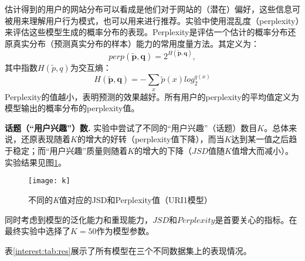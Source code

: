 估计得到的用户的网站分布可以看成是他们对于网站的（潜在）偏好，这些信息可被用来理解用户行为模式，也可以用来进行推荐。实验中使用混乱度（perplexity）来评估这些模型生成的概率分布的表现。Perplexity是评估一个估计的概率分布还原真实分布（预测真实分布的样本）能力的常用度量方法。其定义为：
\[
perp(\mathbf{\widetilde{p}},\mathbf{q}) = 2^{H(\mathbf{\widetilde{p}},\mathbf{q})},
\]
其中指数$H(\widetilde{p},q)$为交互熵：
\[
H(\mathbf{\widetilde{p}},\mathbf{q}) = - \sum_x{\widetilde{p}(x)log_2^{q(x)}}
\]
Perplexity的值越小，表明预测的效果越好。所有用户的perplexity的平均值定义为模型输出的概率分布的perplexity值。


\textbf{话题（``用户兴趣''）数.} 实验中尝试了不同的``用户兴趣''（话题）数目$K$。总体来说，还原表现随着$K$的增大的好转（perplexity值下降），而当$K$达到某一值之后趋于稳定；而``用户兴趣''质量则随着$K$的增大的下降（$JSD$值随$K$值增大而减小）。实验结果见图\ref{interest:fig:k}。

\begin{figure}
\centering
\texttt{[image: k]}
\caption{不同的\textit{K}值对应的JSD和Perplexity值（URI1模型）}
\label{interest:fig:k}
\end{figure}

同时考虑到模型的泛化能力和重现能力，$JSD$和$Perplexity$是首要关心的指标。在最终实验中选择了$K = 50$作为模型参数。

表\ref{interest:tab:res}展示了所有模型在三个不同数据集上的表现情况。

